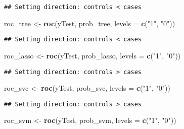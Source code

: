 \documentclass[
]{article}
\newenvironment{Shaded}{\begin{snugshade}}{\end{snugshade}}
\newcommand{\AttributeTok}[1]{\textcolor[rgb]{0.13,0.29,0.53}{#1}}
\newcommand{\FunctionTok}[1]{\textcolor[rgb]{0.13,0.29,0.53}{\textbf{#1}}}
\newcommand{\NormalTok}[1]{#1}
\newcommand{\OtherTok}[1]{\textcolor[rgb]{0.56,0.35,0.01}{#1}}
\newcommand{\StringTok}[1]{\textcolor[rgb]{0.31,0.60,0.02}{#1}}
\begin{document}
\begin{verbatim}
## Setting direction: controls < cases
\end{verbatim}

\begin{Shaded}
\begin{Highlighting}[]
\NormalTok{roc\_tree  }\OtherTok{\textless{}{-}} \FunctionTok{roc}\NormalTok{(yTest, prob\_tree, }\AttributeTok{levels =} \FunctionTok{c}\NormalTok{(}\StringTok{"1"}\NormalTok{, }\StringTok{"0"}\NormalTok{))}
\end{Highlighting}
\end{Shaded}

\begin{verbatim}
## Setting direction: controls < cases
\end{verbatim}

\begin{Shaded}
\begin{Highlighting}[]
\NormalTok{roc\_lasso }\OtherTok{\textless{}{-}} \FunctionTok{roc}\NormalTok{(yTest, prob\_lasso, }\AttributeTok{levels =} \FunctionTok{c}\NormalTok{(}\StringTok{"1"}\NormalTok{, }\StringTok{"0"}\NormalTok{))}
\end{Highlighting}
\end{Shaded}

\begin{verbatim}
## Setting direction: controls > cases
\end{verbatim}

\begin{Shaded}
\begin{Highlighting}[]
\NormalTok{roc\_svc   }\OtherTok{\textless{}{-}} \FunctionTok{roc}\NormalTok{(yTest, prob\_svc, }\AttributeTok{levels =} \FunctionTok{c}\NormalTok{(}\StringTok{"1"}\NormalTok{, }\StringTok{"0"}\NormalTok{))}
\end{Highlighting}
\end{Shaded}

\begin{verbatim}
## Setting direction: controls > cases
\end{verbatim}

\begin{Shaded}
\begin{Highlighting}[]
\NormalTok{roc\_svm   }\OtherTok{\textless{}{-}} \FunctionTok{roc}\NormalTok{(yTest, prob\_svm, }\AttributeTok{levels =} \FunctionTok{c}\NormalTok{(}\StringTok{"1"}\NormalTok{, }\StringTok{"0"}\NormalTok{))}
\end{Highlighting}
\end{Shaded}
\end{document}
